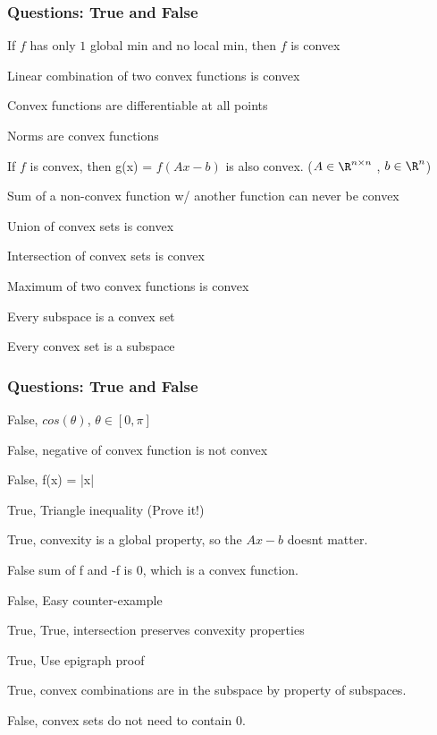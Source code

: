 \documentclass{beamer}
\renewenvironment{enumerate}%
{\begin{list}{\arabic{enumi}.}%
      {\setlength{\leftmargin}{2.5em}%
       \setlength{\itemsep}{-\parsep}%
       \setlength{\topsep}{-\parskip}%
       \usecounter{enumi}}%
 }{\end{list}}
\begin{document}
\begin{frame}

\frametitle{Questions: True and False}
\begin{enumerate}

\item If $f$ has only $1$ global min and no local min, then $f$ is convex
\item Linear combination of two convex functions is convex
\item Convex functions are differentiable at all points
\item Norms are convex functions
\item If $f$ is convex, then g(x) = $f(Ax-b)$ is also convex. ($A\in\R^{n\times n}$ , $b\in \R^n$)
\item Sum of a non-convex function w/ another function can never be convex
\item Union of convex sets is convex
\item Intersection of convex sets is convex
\item Maximum of two convex functions is convex
\item Every subspace is a convex set
\item Every convex set is a subspace
\end{enumerate}
\end{frame}

\begin{frame}
\frametitle{Questions: True and False}
\begin{enumerate}
\item False, $cos(\theta)$, $\theta\in[0,\pi]$
\item False, negative of convex function is not convex
\item False, f(x) = |x|
\item True, Triangle inequality (Prove it!)
\item True, convexity is a global property, so the $Ax-b$ doesnt matter.
\item False sum of f and -f is 0, which is a convex function.
\item False, Easy counter-example
\item True,  True, intersection preserves convexity properties
\item True, Use epigraph proof
\item True, convex combinations are in the subspace by property of subspaces.
\item False, convex sets do not need to contain 0.
\end{enumerate}
\end{frame}
\end{document}
